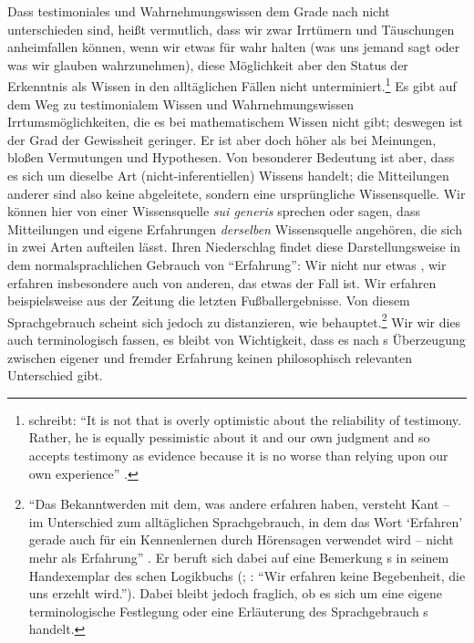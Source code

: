 Dass testimoniales und Wahrnehmungswissen dem Grade nach nicht unterschieden
sind, heißt vermutlich, dass wir zwar Irrtümern und Täuschungen
anheimfallen können, wenn wir etwas für wahr halten (was uns jemand sagt
oder was wir glauben wahrzunehmen), diese Möglichkeit aber den Status der
Erkenntnis als Wissen in den alltäglichen Fällen nicht
unterminiert.\footnote{ schreibt:
\enquote{It is not that  is overly optimistic about the
reliability of testimony. Rather, he is equally pessimistic about it and our own judgment and
so accepts testimony as evidence because it is no worse than relying upon our
own experience} \parencite[][52]{Pasternack:KantonOpinion2014}.} Es gibt auf dem
Weg zu testimonialem Wissen und Wahrnehmungswissen Irrtumsmöglichkeiten, die es bei mathematischem Wissen nicht
gibt; deswegen ist der Grad der Gewissheit geringer. Er ist aber doch höher als
bei Meinungen, bloßen Vermutungen und
Hypothesen. Von besonderer Bedeutung ist aber, dass es sich um dieselbe Art
(nicht-inferentiellen) Wissens handelt; die Mitteilungen anderer sind also keine
abgeleitete, sondern eine ursprüngliche Wissensquelle. Wir können hier von einer
Wissensquelle \emph{sui generis} sprechen oder sagen, dass Mitteilungen und
eigene Erfahrungen \emph{derselben} Wissensquelle angehören, die sich in zwei
Arten aufteilen lässt. Ihren Niederschlag findet diese
Darstellungsweise in dem normalsprachlichen Gebrauch von \enquote{Erfahrung}:
Wir  nicht nur etwas , wir
erfahren insbesondere auch von anderen, das etwas der Fall ist. Wir erfahren
beispielsweise aus der Zeitung die letzten Fußballergebnisse. Von diesem
Sprachgebrauch scheint sich  jedoch zu distanzieren, wie
behauptet.\footnote{\enquote{Das Bekanntwerden mit dem, was andere erfahren
haben, versteht Kant -- im Unterschied zum alltäglichen Sprachgebrauch, in dem das Wort \enquote{Erfahren}
gerade auch für ein Kennenlernen durch Hörensagen verwendet wird -- nicht mehr
als Erfahrung} \parencite[][124]{Holzhey:KantsErfahrungsbegriff1970}. Er beruft
sich dabei auf eine Bemerkung s in seinem Handexemplar des
schen Logikbuchs
\mkbibparens{\cite[siehe][2844]{Kant:Reflexionen1900ff.}; \cite[][XVI:
542.7]{Kant:GesammelteWerke1900ff.}: \enquote{Wir erfahren keine Begebenheit,
die uns erzehlt wird.}}.
Dabei bleibt jedoch fraglich, ob es sich um eine eigene terminologische
Festlegung oder eine Erläuterung des Sprachgebrauch
s handelt.} Wir wir dies auch terminologisch
fassen, es bleibt von Wichtigkeit, dass es nach s
Überzeugung zwischen eigener und fremder Erfahrung keinen philosophisch
relevanten Unterschied gibt.

